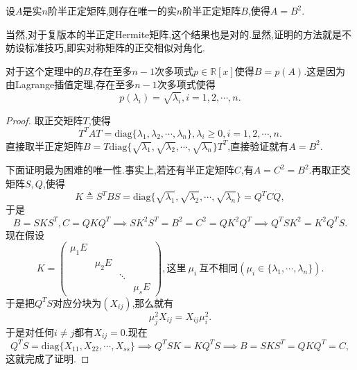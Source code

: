 \documentclass[../../main.tex]{subfiles}
\begin{document}
\begin{theorem}[半正定矩阵开方唯一]\label{theorem:半正定矩阵开方唯一}
设\( A \)是实\( n \)阶半正定矩阵,则存在唯一的实\( n \)阶半正定矩阵\( B \),使得\( A = B^2 \).
\end{theorem}
\begin{note}
当然,对于复版本的半正定Hermite矩阵,这个结果也是对的.显然,证明的方法就是不妨设标准技巧,即实对称矩阵的正交相似对角化.
\end{note}
\begin{remark}
对于这个定理中的\( B \),存在至多\( n - 1 \)次多项式\( p \in \mathbb{R}[x] \)使得\( B = p(A) \).这是因为由Lagrange插值定理,存在至多\( n - 1 \)次多项式使得
\[
p(\lambda_i) = \sqrt{\lambda_i}, i = 1, 2, \cdots, n.
\]
\end{remark}
\begin{proof}
取正交矩阵\( T \),使得
\[
T^T A T = \text{diag}\{\lambda_1, \lambda_2, \cdots, \lambda_n\}, \lambda_i \geqslant  0, i = 1, 2, \cdots, n.
\]
直接取半正定矩阵\( B = T \text{diag}\{\sqrt{\lambda_1}, \sqrt{\lambda_2}, \cdots, \sqrt{\lambda_n}\} T^T \),直接验证就有\( A = B^2 \).

下面证明最为困难的唯一性.事实上,若还有半正定矩阵\( C \),有\( A = C^2 = B^2 \).再取正交矩阵\( S, Q \),使得
\[
K \triangleq S^T B S = \text{diag}\{\sqrt{\lambda_1}, \sqrt{\lambda_2}, \cdots, \sqrt{\lambda_n}\} = Q^T C Q,
\]
于是
\[
B = S K S^T, C = Q K Q^T \implies S K^2 S^T =B^2=C^2= Q K^2 Q^T \implies Q^T S K^2 = K^2 Q^T S.
\]
现在假设
\[
K = \begin{pmatrix}
\mu_1 E \\
& \mu_2 E \\
& & \ddots \\
& & & \mu_s E
\end{pmatrix}, \text{这里}\ \mu_i\ \text{互不相同}(\mu_i\in \{\lambda_1,\cdots,\lambda_n\}).
\]
于是把\( Q^T S \)对应分块为\( (X_{ij}) \),那么就有
\[
\mu_j^2 X_{ij} = X_{ij} \mu_i^2.
\]
于是对任何\( i \neq j \)都有\( X_{ij} = 0 \).现在
\[
Q^T S = \text{diag}\{X_{11}, X_{22}, \cdots, X_{ss}\} \implies Q^T S K = K Q^T S \implies B = S K S^T = Q K Q^T = C,
\]
这就完成了证明.

\end{proof}
\end{document}
